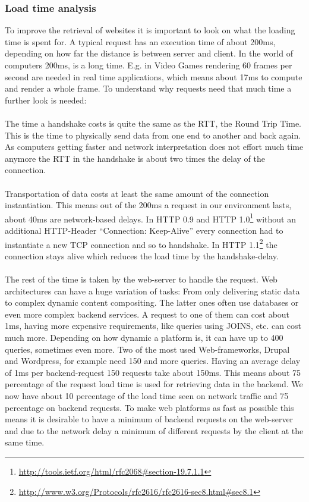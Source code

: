 \documentclass[f,bachelor,binding,twoside,palatino]{WeSTthesis}
\begin{document}
    \subsubsection{Load time analysis\label{httpLoadTime}}
      To improve the retrieval of websites it is important to look on what the loading time is spent for.
      A typical request has an execution time of about 200ms, depending on how far the distance is between server and client.
      In the world of computers 200ms, is a long time.
      E.g. in Video Games rendering 60 frames per second are needed in real time applications, which means about 17ms to compute and render a whole frame.
      To understand why requests need that much time a further look is needed:\\\\
      The time a handshake costs is quite the same as the RTT, the Round Trip Time.
      This is the time to physically send data from one end to another and back again.
      As computers getting faster and network interpretation does not effort much time anymore the RTT in the handshake is about two times the delay of the connection.\\\\
      Transportation of data costs at least the same amount of the connection instantiation. 
      This means out of the 200ms a request in our environment lasts, about 40ms are network-based delays.
      In HTTP 0.9 and HTTP 1.0\footnote{\url{http://tools.ietf.org/html/rfc2068#section-19.7.1.1}} without an additional HTTP-Header \enquote{Connection: Keep-Alive} every connection had to instantiate a new TCP connection and so to handshake. 
      In HTTP 1.1\footnote{\url{http://www.w3.org/Protocols/rfc2616/rfc2616-sec8.html#sec8.1}} the connection stays alive which reduces the load time by the handshake-delay.\\\\
      The rest of the time is taken by the web-server to handle the request. 
      Web architectures can have a huge variation of tasks: 
      From only delivering static data to complex dynamic content compositing. 
      The latter ones often use databases or even more complex backend services. 
      A request to one of them can cost about 1ms, having more expensive requirements, like queries using JOINS, etc. can cost much more.
      Depending on how dynamic a platform is, it can have up to 400 queries, sometimes even more. 
      Two of the most used Web-frameworks, Drupal and Wordpress, for example need 150 and more queries.
      Having an average delay of 1ms per backend-request 150 requests take about 150ms.
      This means about 75 percentage of the request load time is used for retrieving data in the backend.
      We now have about 10 percentage of the load time seen on network traffic and 75 percentage on backend requests. 
      To make web platforms as fast as possible this means it is desirable to have a minimum of backend requests on the web-server and due to the network delay a minimum of different requests by the client at the same time.
\end{document}
